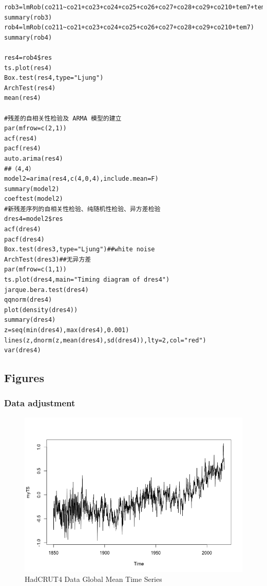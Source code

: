 \documentclass[a4paper,11pt]{article}
\begin{document}
\begin{verbatim}
rob3=lmRob(co211~co21+co23+co24+co25+co26+co27+co28+co29+co210+tem7+tem10)
summary(rob3)
rob4=lmRob(co211~co21+co23+co24+co25+co26+co27+co28+co29+co210+tem7)
summary(rob4)

res4=rob4$res
ts.plot(res4)
Box.test(res4,type="Ljung") 
ArchTest(res4)
mean(res4)

#残差的自相关性检验及 ARMA 模型的建立
par(mfrow=c(2,1))
acf(res4)
pacf(res4)
auto.arima(res4)
##（4,4）
model2=arima(res4,c(4,0,4),include.mean=F)
summary(model2)
coeftest(model2)
#新残差序列的自相关性检验、纯随机性检验、异方差检验
dres4=model2$res
acf(dres4)
pacf(dres4)
Box.test(dres3,type="Ljung")##white noise
ArchTest(dres3)##无异方差
par(mfrow=c(1,1))
ts.plot(dres4,main="Timing diagram of dres4")
jarque.bera.test(dres4) 
qqnorm(dres4) 
plot(density(dres4)) 
summary(dres4) 
z=seq(min(dres4),max(dres4),0.001) 
lines(z,dnorm(z,mean(dres4),sd(dres4)),lty=2,col="red") 
var(dres4)

\end{verbatim}


\subsection{Figures}

\subsubsection{Data adjustment}

\begin{figure}[H]
\centering
\caption{HadCRUT4 Data Global Mean Time Series}
\includegraphics[scale=.5]{temp.png}
\end{figure}
\end{document}
